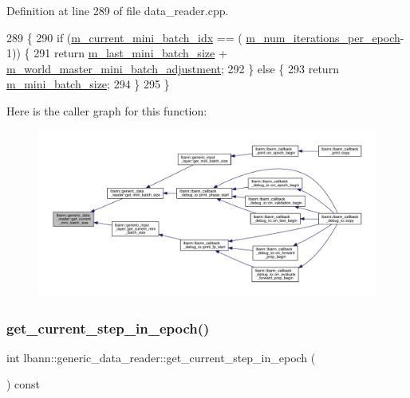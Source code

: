 Definition at line 289 of file data\+\_\+reader.\+cpp.


\begin{DoxyCode}
289                                                            \{
290   \textcolor{keywordflow}{if} (\hyperlink{classlbann_1_1generic__data__reader_aefd4bc0bf95de1e2500827581acf3536}{m\_current\_mini\_batch\_idx} == (
      \hyperlink{classlbann_1_1generic__data__reader_ab570063483a1f604ca2fc536c3d83de7}{m\_num\_iterations\_per\_epoch}-1)) \{
291     \textcolor{keywordflow}{return} \hyperlink{classlbann_1_1generic__data__reader_a241f77b6209de4ae656bc34ad51bb612}{m\_last\_mini\_batch\_size} + 
      \hyperlink{classlbann_1_1generic__data__reader_acd33b2dbdfd4043ecc62cc13789532a2}{m\_world\_master\_mini\_batch\_adjustment};
292   \} \textcolor{keywordflow}{else} \{
293     \textcolor{keywordflow}{return} \hyperlink{classlbann_1_1generic__data__reader_a96f87a7d09711ab3eee3940ff2aa36ec}{m\_mini\_batch\_size};
294   \}
295 \}
\end{DoxyCode}
Here is the caller graph for this function\+:\nopagebreak
\begin{figure}[H]
\begin{center}
\leavevmode
\includegraphics[width=350pt]{classlbann_1_1generic__data__reader_aec4624f295e1e3c6c5053838624441a5_icgraph}
\end{center}
\end{figure}
\mbox{\label{classlbann_1_1generic__data__reader_a7c884d3646396a05d9e01e3b7a260419}} 
\subsubsection{\texorpdfstring{get\+\_\+current\+\_\+step\+\_\+in\+\_\+epoch()}{get\_current\_step\_in\_epoch()}}
{\footnotesize\ttfamily int lbann\+::generic\+\_\+data\+\_\+reader\+::get\+\_\+current\+\_\+step\+\_\+in\+\_\+epoch (\begin{DoxyParamCaption}{ }\end{DoxyParamCaption}) const\hspace{0.3cm}{\ttfamily [inline]}}




